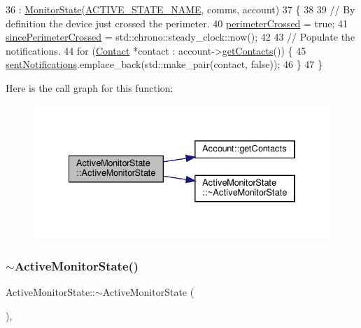 \begin{DoxyCode}
36         : \hyperlink{class_monitor_state_ace027ab9e5703ac4e4b808eeebc3c961}{MonitorState}(\hyperlink{_active_monitor_state_8h_a9fdfa2faf1d746d8aa632437fd3bd03c}{ACTIVE\_STATE\_NAME}, comms, account)
37 \{
38 
39     \textcolor{comment}{// By definition the device just crossed the perimeter.}
40     \hyperlink{class_active_monitor_state_af4c93e1be350ea9cf4ac97f97abaf79e}{perimeterCrossed} = \textcolor{keyword}{true};
41     \hyperlink{class_active_monitor_state_a4313399b0922fccd66ecea2fcf77c08f}{sincePerimeterCrossed} = std::chrono::steady\_clock::now();
42 
43     \textcolor{comment}{// Populate the notifications.}
44     \textcolor{keywordflow}{for} (\hyperlink{class_contact}{Contact} *contact : account->\hyperlink{class_account_a53a9e366a589538552a368e3bbac2fd3}{getContacts}()) \{
45         \hyperlink{class_active_monitor_state_a25493a87079926faf7d03b8587ad9f62}{sentNotifications}.emplace\_back(std::make\_pair(contact, \textcolor{keyword}{false}));
46     \}
47 \}
\end{DoxyCode}
Here is the call graph for this function\+:
\nopagebreak
\begin{figure}[H]
\begin{center}
\leavevmode
\includegraphics[width=334pt]{d9/db8/class_active_monitor_state_af1a0341307d63c900ccdc0a99fbe59e0_cgraph}
\end{center}
\end{figure}
\mbox{\label{class_active_monitor_state_accb86642ec52bae9aacd2aa4e9ff4410}} 
\subsubsection{\texorpdfstring{$\sim$\+Active\+Monitor\+State()}{~ActiveMonitorState()}}
{\footnotesize\ttfamily Active\+Monitor\+State\+::$\sim$\+Active\+Monitor\+State (\begin{DoxyParamCaption}{ }\end{DoxyParamCaption})\hspace{0.3cm}{\ttfamily [override]}, {\ttfamily [default]}}

